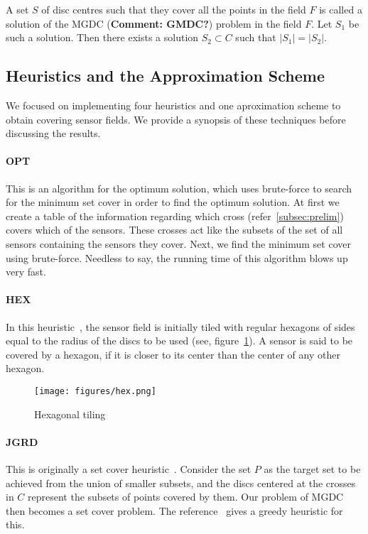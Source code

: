 A set $S$ of disc centres such that they cover all the points in the field $F$ is called a solution of the MGDC ({\bf Comment: GMDC?}) problem in the field $F$. Let $S_1$ be such a solution. Then there exists a solution $S_2 \subset C$ such that $|S_1|=|S_2|$.

\subsection{Heuristics and the Approximation Scheme}

We focused on implementing four heuristics and one aproximation scheme to
obtain covering sensor fields. We provide a synopsis of these techniques
before discussing the results.

\paragraph*{OPT} 
This is an algorithm for the optimum solution, which uses brute-force to search for the minimum set cover in order to find the optimum solution. At first we create a table of the information regarding which cross (refer~\ref{subsec:prelim}) covers which of the sensors. These crosses act like the subsets of the set of all sensors containing the sensors they cover. Next, we find the minimum set cover using brute-force. Needless to say, the running time of this algorithm blows up very fast.

\paragraph*{HEX} 
In this heuristic~\cite{hex}, the sensor field is initially tiled with regular hexagons of sides equal to the radius of the discs to be used (see, figure~\ref{fig:hex}). A sensor is said to be covered by a hexagon, if it is closer to its center than the center of any other hexagon.
\begin{center}
\begin{figure}[H]
\texttt{[image: figures/hex.png]}
\caption{Hexagonal tiling}\label{fig:hex}
\end{figure}
\end{center}

\paragraph*{JGRD} 
This is originally a set cover heuristic~\cite{jgreedy}. Consider the set $P$ as the target set to be achieved from the union of smaller subsets, and the discs centered at the crosses in $C$ represent the subsets of points covered by them. Our problem of MGDC then becomes a set cover problem. 
The reference~\cite{jgreedy} gives a greedy heuristic for this.

